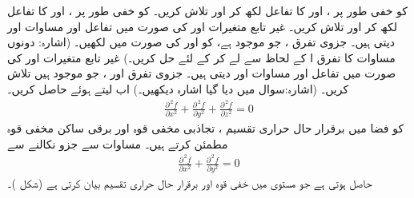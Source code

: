 کو خفی طور پر ،  اور  کا تفاعل لکھ کر  اور  تلاش کریں۔
 کو خفی طور پر ،  اور  کا تفاعل لکھ کر  اور  تلاش کریں۔
غیر تابع متغیرات  اور  کی صورت میں تفاعل   اور  مساوات  اور  دیتی ہیں۔ جزوی تفرق  ،  جو موجود ہے، کو  اور  کی صورت میں لکھیں۔ (اشارہ: دونوں مساوات کا تفرق   ا کے لحاظ سے لے کر  کے لئے حل کریں۔)
غیر تابع متغیرات  اور  کی صورت میں تفاعل   اور  مساوات  اور  دیتی ہیں۔ جزوی تفرق  اور   ،  جو موجود  ہیں تلاش کریں۔ (اشارہ:سوال  میں دیا گیا اشارہ دیکھیں۔)   اب  لیتے ہوئے  حاصل کریں۔
\\
\begin{align}\label{مساوات_کثیر_المتغیر_مساوات_لاپلاس_الف}
\frac{\partial^{\,2}f}{\partial x^2}+\frac{\partial^{\,2}f}{\partial y^2}+\frac{\partial^{\,2}f}{\partial z^2}=0
\end{align}
کو فضا میں  برقرار حال حراری تقسیم ، تجاذبی  مخفی قوہ اور برقی ساکن مخفی قوہ   مطمئن کرتے ہیں۔ مساوات  سے جزو  نکالنے سے    
 \begin{align}\label{مساوات_کثیر_المتغیر_مساوات_لاپلاس_ب}
\frac{\partial^{\,2}f}{\partial x^2}+\frac{\partial^{\,2}f}{\partial y^2}=0
\end{align}
حاصل ہوتی ہے جو مستوی میں  خفی قوہ اور برقرار حال حراری تقسیم  بیان کرتی ہے (شکل )۔

